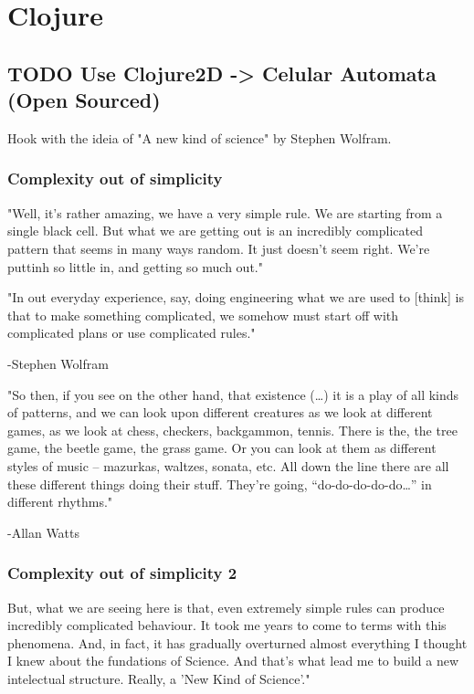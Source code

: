 \documentclass[11pt]{article}
\author{Pedro G. Branquinho}
\date{\today}
\title{}
\begin{document}
\tableofcontents



\section{Clojure}
\label{sec:org1c7f568}
\subsection{{\bfseries\sffamily TODO} Use Clojure2D -> Celular Automata (Open Sourced)}
\label{sec:orgf6a1073}
Hook with the ideia of "A new kind of science" by Stephen Wolfram.

\subsubsection{Complexity out of simplicity}
\label{sec:org0b5f868}
"Well, it's rather amazing, we have a very simple rule. We are
starting from a single black cell. But what we are getting out is an
incredibly complicated pattern that seems in many ways random. It just
doesn't seem right. We're puttinh so little in, and getting so much
out."

"In out everyday experience, say, doing engineering what we are used
to [think] is that to make something complicated, we somehow must
start off with complicated plans or use complicated rules."

-Stephen Wolfram

"So then, if you see on the other hand, that existence (\ldots{}) it is a
play of all kinds of patterns, and we can look upon different
creatures as we look at different games, as we look at chess,
checkers, backgammon, tennis. There is the, the tree game, the beetle
game, the grass game. Or you can look at them as different styles of
music – mazurkas, waltzes, sonata, etc. All down the line there are
all these different things doing their stuff. They’re going,
“do-do-do-do-do…” in different rhythms."

-Allan Watts

\subsubsection{Complexity out of simplicity 2}
\label{sec:orgdbb62a0}
But, what we are seeing here is that, even extremely simple rules can
produce incredibly complicated behaviour. It took me years to come to
terms with this phenomena. And, in fact, it has gradually overturned
almost everything I thought I knew about the fundations of
Science. And that's what lead me to build a new intelectual
structure. Really, a 'New Kind of Science'."
\end{document}
